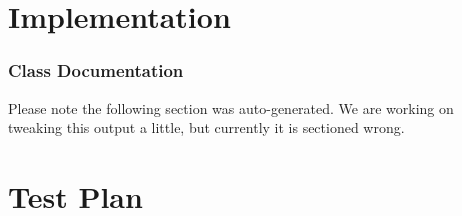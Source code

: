 \documentclass{report}
\begin{document}
\chapter{Implementation}

    \subsection{Class Documentation}

Please note the following section was auto-generated. We are
working on tweaking this output a little, but currently it is
sectioned wrong.

%
%
%
%
%
%
%
%
%
%

\chapter{Test Plan}
\end{document}
